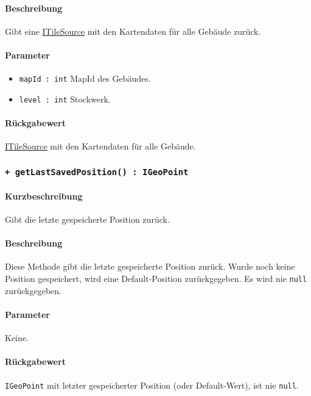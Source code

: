 \paragraph*{Beschreibung}
Gibt eine \href{https://osmdroid.github.io/osmdroid/javadocAll/org/osmdroid/tileprovider/tilesource/ITileSource.html}
{ITileSource} mit den Kartendaten für alle Gebäude zurück.
\paragraph*{Parameter}
\begin{itemize}
    \item \texttt{mapId : int} MapId des Gebäudes.
    \item \texttt{level : int} Stockwerk.
\end{itemize}
\paragraph*{Rückgabewert}
\href{https://osmdroid.github.io/osmdroid/javadocAll/org/osmdroid/tileprovider/tilesource/ITileSource.html}
{ITileSource} mit den Kartendaten für alle Gebäude.

\subsubsection*{\texttt{+ getLastSavedPosition() : IGeoPoint}}\label{App_Map_Model_getLastSavedPosition_IMap}%
\paragraph*{Kurzbeschreibung}
Gibt die letzte gespeicherte Position zurück.
\paragraph*{Beschreibung}
Diese Methode gibt die letzte gespeicherte Position zurück. Wurde noch keine Position gespeichert,
wird eine Default-Position zurückgegeben. Es wird nie \texttt{null} zurückgegeben.
\paragraph*{Parameter}
Keine.
\paragraph*{Rückgabewert}
\texttt{IGeoPoint} mit letzter gespeicherter Position (oder Default-Wert), ist nie \texttt{null}.

